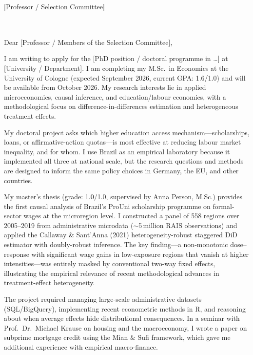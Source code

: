 \documentclass[a4paper,11pt]{letter}
\begin{document}
\begin{letter}{%
    [Professor / Selection Committee] \\
    [Department of Economics] \\
    [University] \\
    [Address]
}

\opening{Dear [Professor / Members of the Selection Committee],}

I am writing to apply for the [PhD position / doctoral programme in \ldots] at [University / Department]. I am completing my M.Sc.\ in Economics at the University of Cologne (expected September 2026, current GPA: 1.6/1.0) and will be available from October 2026. My research interests lie in applied microeconomics, causal inference, and education/labour economics, with a methodological focus on difference-in-differences estimation and heterogeneous treatment effects.


My doctoral project asks which higher education access mechanism---scholarships, loans, or affirmative-action quotas---is most effective at reducing labour market inequality, and for whom. I use Brazil as an empirical laboratory because it implemented all three at national scale, but the research questions and methods are designed to inform the same policy choices in Germany, the EU, and other countries.

My master's thesis (grade: 1.0/1.0, supervised by Anna Person, M.Sc.) provides the first causal analysis of Brazil's ProUni scholarship programme on formal-sector wages at the microregion level. I constructed a panel of 558 regions over 2005--2019 from administrative microdata ($\sim$5\,million RAIS observations) and applied the Callaway \& Sant'Anna (2021) heterogeneity-robust staggered DiD estimator with doubly-robust inference. The key finding---a non-monotonic dose--response with significant wage gains in low-exposure regions that vanish at higher intensities---was entirely masked by conventional two-way fixed effects, illustrating the empirical relevance of recent methodological advances in treatment-effect heterogeneity.

The project required managing large-scale administrative datasets (SQL/BigQuery), implementing recent econometric methods in R, and reasoning about when average effects hide distributional consequences. In a seminar with Prof.\ Dr.\ Michael Krause on housing and the macroeconomy, I wrote a paper on subprime mortgage credit using the Mian \& Sufi framework, which gave me additional experience with empirical macro-finance.


\end{letter}
\end{document}
